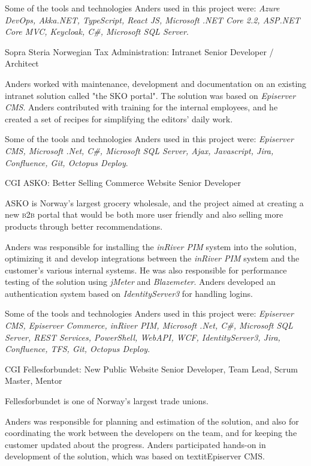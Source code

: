 \documentclass[10pt]{article} %
\begin{document}
\begin{paracol}{2}
{\qquad Some of the tools and technologies Anders used in this project were: \textit{Azure DevOps, Akka.NET, TypeScript, React JS, Microsoft .NET Core 2.2, ASP.NET Core MVC, Keycloak, C\#, Microsoft SQL Server}.} 



{Sopra Steria} %
{Norwegian Tax Administration: Intranet} 
{Senior Developer / Architect} 
{Anders worked with maintenance, development and documentation on an existing intranet solution called "the SKO portal". The solution was based on \textit{Episerver CMS}. Anders contributed with training for the internal employees, and he created a set of recipes for simplifying the editors' daily work.

\qquad Some of the tools and technologies Anders used in this project were: \textit{Episerver CMS, Microsoft .Net, C\#, Microsoft SQL Server, Ajax, Javascript, Jira, Confluence, Git, Octopus Deploy}.} 

{CGI} %
{ASKO: Better Selling Commerce Website} 
{Senior Developer} 
{ASKO is Norway's largest grocery wholesale, and the project aimed at creating a new \textsc{b2b} portal that would be both more user friendly and also selling more products through better recommendations.

\qquad Anders was responsible for installing the \textit{inRiver PIM} system into the solution, optimizing it and develop integrations between the \textit{inRiver PIM} system and the customer's various internal systems. He was also responsible for performance testing of
the solution using \textit{jMeter} and \textit{Blazemeter}. Anders developed an authentication system based on \textit{IdentityServer3}
for handling logins.

\qquad Some of the tools and technologies Anders used in this project were: \textit{Episerver CMS, Episerver Commerce, inRiver PIM, Microsoft .Net, C\#, Microsoft SQL Server, REST Services, PowerShell, WebAPI, WCF, IdentityServer3, Jira, Confluence, TFS, Git, Octopus Deploy}.} 
\pagebreak


{CGI} 
{Fellesforbundet: New Public Website} 
{Senior Developer, Team Lead, Scrum Master, Mentor} 
{Fellesforbundet is one of Norway's largest trade unions.

\qquad Anders was responsible for planning and estimation of the solution, and also for coordinating the work between the developers on the team, and for keeping the customer updated about the progress. Anders participated hands-on in development of the solution, which was based on textit{Episerver CMS}.

}
\end{paracol}
\end{document}
